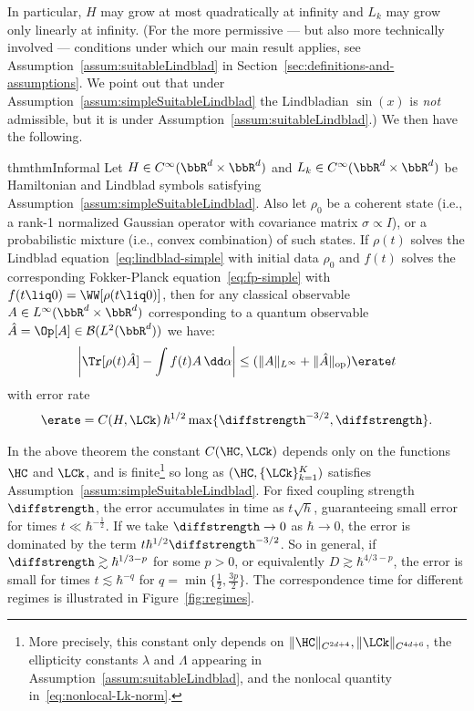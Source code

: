 \documentclass{article}
\numberwithin{equation}{section}
\begin{document}
\noindent In particular, $H$ may grow at most quadratically at infinity and $L_k$ may grow only linearly at infinity. 
(For the more permissive --- but also more technically involved --- conditions under which our main result applies, see Assumption~\ref{assum:suitableLindblad} in Section~\ref{sec:definitions-and-assumptions}. 
We point out that under Assumption~\ref{assum:simpleSuitableLindblad} the Lindbladian $\sin(x)$ is \textit{not} admissible, but it is under Assumption~\ref{assum:suitableLindblad}.) 
We then have the following.
\begin{restatable}{thm}{thmInformal}
\label{thm:informal}
Let $H\in C^\infty(\bbR^d\times\bbR^d)$ and $L_k\in C^\infty(\bbR^d\times\bbR^d)$ be Hamiltonian and Lindblad symbols satisfying Assumption~\ref{assum:simpleSuitableLindblad}.
Also let $\rho_0$ be a coherent state (i.e., a rank-1 normalized Gaussian operator with covariance matrix $\sigma\propto I$), or a probabilistic mixture (i.e., convex combination) of such states.   If $\rho(t)$ solves the Lindblad equation~\eqref{eq:lindblad-simple} with 
initial data $\rho_0$ and $f(t)$ solves the corresponding Fokker-Planck equation~\eqref{eq:fp-simple} with $f(t\liq 0) = \WW[\rho(t\liq 0)]$, 
then for any classical observable $A\in L^\infty(\bbR^d\times\bbR^d)$ corresponding to a quantum observable
$\hat{A} = \Op[A] \in \mathcal{B}(L^2(\bbR^d))$ we have:
\begin{equation} \label{eq:smooth-observable-bound}
\left|\Tr[\rho(t) \hat{A}] - \int f(t) A \, \dd \alpha\right| \leq  
(\|A\|_{L^\infty} +
\|\hat{A}\|_{\mathrm{op}})
\erate t
\end{equation}
with error rate
\begin{align}\label{eq:main-informal-r}
   \erate = C(H, \LCk)\, \hbar^{1/2} 
   \max\{ \diffstrength^{-3/2}, \diffstrength\}.
\end{align}
\end{restatable}

In the above theorem the constant $C(\HC, \LCk)$ depends only on the functions $\HC$ and $\LCk$, and is finite\footnote{More precisely, this constant only depends on $\|\HC\|_{C^{2d+4}}, \|\LCk\|_{C^{4d+6}}$, the ellipticity constants $\lambda$ and $\Lambda$ appearing in Assumption~\ref{assum:suitableLindblad}, and the nonlocal quantity in~\eqref{eq:nonlocal-Lk-norm}.} so long as $(\HC,\{\LCk\}_{k=1}^K)$ satisfies Assumption~\ref{assum:simpleSuitableLindblad}. 
For fixed coupling strength $\diffstrength$, the error accumulates in time as $t\sqrt{h}$, guaranteeing small error for times $t \ll \hbar^{-\frac{1}{2}}$. If we take $\diffstrength\to 0$ as $\hbar\to 0$, the error is dominated by the term $t\hbar^{1/2}\diffstrength^{-3/2}$.  So in general, if $\diffstrength \gtrsim \hbar^{1/3 - p}$ for some $p>0$,
or equivalently $D \gtrsim \hbar^{4/3 - p}$, the error is small for times $t \lesssim \hbar^{-q}$ for $q=\min\{\frac12,\frac{3p}{2}\}$. The correspondence time for different regimes is illustrated in Figure~\ref{fig:regimes}.
\end{document}

